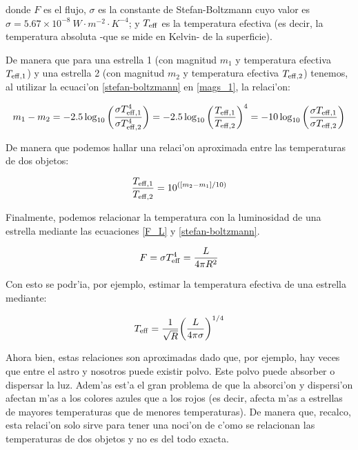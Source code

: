\documentclass{article}
\begin{document}
\begin{enumerate}[a)]
donde $F$ es el flujo, $\sigma$ es la constante de Stefan-Boltzmann cuyo valor es $\sigma = 5.67 \times 10^{-8} \ W \cdot m^{-2} \cdot K^{-4}$; y $T_{\rm eff}$ es la temperatura efectiva (es decir, la temperatura absoluta -que se mide en Kelvin- de la superficie).

De manera que para una estrella 1 (con magnitud $m_1$ y temperatura efectiva $T_{\rm eff,1}$) y una estrella 2 (con magnitud $m_2$ y temperatura efectiva $T_{\rm eff,2}$) tenemos, al utilizar la ecuaci'on \eqref{stefan-boltzmann} en \eqref{mags_1}, la relaci'on:

\begin{equation*}
m_1 - m_2 = -2.5 \log_{10} \bigg( \frac{\sigma T_{\rm eff,1}^4}{\sigma T_{\rm eff,2}^4} \bigg) = -2.5 \log_{10} \bigg( \frac{T_{\rm eff,1}}{T_{\rm eff,2}} \bigg)^4 = -10 \log_{10} \bigg( \frac{\sigma T_{\rm eff,1}}{\sigma T_{\rm eff,2}} \bigg)
\end{equation*}

De manera que podemos hallar una relaci'on aproximada entre las temperaturas de dos objetos:

\begin{equation}
\frac{T_{\rm eff,1}}{T_{\rm eff,2}} = 10^{([m_2 - m_1]/10)} 
\end{equation}

Finalmente, podemos relacionar la temperatura con la luminosidad de una estrella mediante las ecuaciones \eqref{F_L} y \eqref{stefan-boltzmann}. 

\begin{equation}
F = \sigma T_{\rm eff}^4 = \frac{L}{4 \pi R^2}
\end{equation}

Con esto se podr'ia, por ejemplo, estimar la temperatura efectiva de una estrella mediante:

\begin{equation}
T_{\rm eff} = \frac{1}{\sqrt{R}} \bigg( \frac{L}{4 \pi \sigma} \bigg)^{1/4}
\end{equation}

Ahora bien, estas relaciones son aproximadas dado que, por ejemplo, hay veces que entre el astro y nosotros puede existir polvo. Este polvo puede absorber o dispersar la luz. Adem'as est'a el gran problema de que la absorci'on y dispersi'on afectan m'as a los colores azules que a los rojos (es decir, afecta m'as a estrellas de mayores temperaturas que de menores temperaturas). De manera que, recalco, esta relaci'on solo sirve para tener una noci'on de c'omo se relacionan las temperaturas de dos objetos y no es del todo exacta.
  

\end{enumerate}
\end{document}
